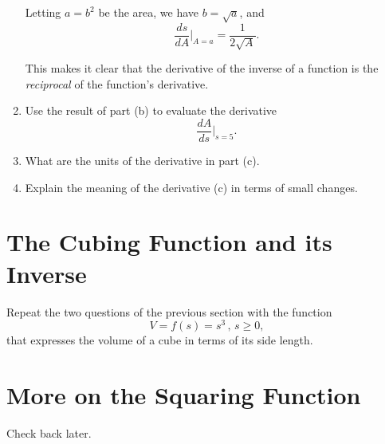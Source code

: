 \documentclass{ximera}
\begin{document}
\begin{question}
\begin{enumerate}
\begin{explanation}
Letting $a = b^2$ be the area, we have $b=\sqrt{a}$, and
\[
  \frac{ds}{dA}\Big|_{A=a} = \frac{1}{2\sqrt{A}}.
\]

This makes it clear that the derivative of the inverse of a function is the \emph{reciprocal} of the function's derivative.

\end{explanation}


\item Use the result of part (b) to evaluate the derivative
\[
   \frac{dA}{ds}\Big|_{s=5}.
\]

\item What are the units of the derivative in part (c).

\item Explain the meaning of the derivative (c) in terms of small changes.


\end{enumerate}
\end{question}

\section{The Cubing Function and its Inverse}

\begin{question} \label{QRDFGGERE}
Repeat the two questions of the previous section with the function
\[
    V = f(s) = s^3 \, , \, s\geq 0 ,
\]
that expresses the volume of a cube in terms of its side length.
\end{question}




\section{More on the Squaring Function}

Check back later.
\end{document}
